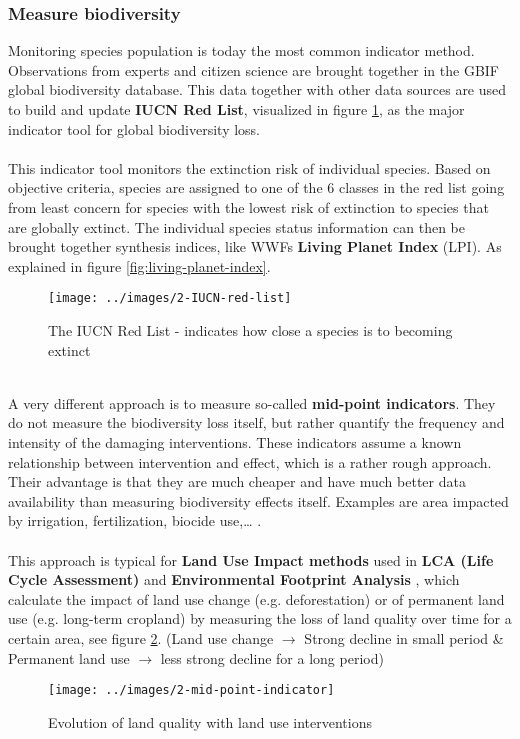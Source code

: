 \documentclass[../summary.tex]{subfiles}
\begin{document}
	\subsubsection{Measure biodiversity}
	Monitoring species population is today the most common indicator method. Observations from experts and citizen science are brought together in the GBIF global biodiversity database. This data together with other data sources are used to build and update \textbf{IUCN Red List}, visualized in figure \ref{fig:iucn-red-list}, as the major indicator tool for global biodiversity loss.
	\\\\
	This indicator tool monitors the extinction risk of individual species. Based on objective criteria, species are assigned to one of the 6 classes in the red list going from least concern for species with the lowest risk of extinction to species that are globally extinct. The individual species status information can then be brought together synthesis indices, like WWFs \textbf{Living Planet Index} (LPI). As explained in figure \ref{fig:living-planet-index}.
	
	\begin{figure}[H]
		\centering
		\texttt{[image: ../images/2-IUCN-red-list]}
		\caption{The IUCN Red List - indicates how close a species is to becoming extinct}
		\label{fig:iucn-red-list}
	\end{figure}
	
	\newpage
	\ \\
	A very different approach is to measure so-called \textbf{mid-point indicators}. They do not measure the biodiversity loss itself, but rather quantify the frequency and intensity of the damaging interventions. These indicators assume a known relationship between intervention and effect, which is a rather rough approach. Their advantage is that they are much cheaper and have much better data availability than measuring biodiversity effects itself. Examples are area impacted by irrigation, fertilization, biocide use,… .
	\\\\
	This approach is typical for \textbf{Land Use Impact methods} used in \textbf{LCA (Life Cycle Assessment)} and \textbf{Environmental Footprint Analysis} , which calculate the impact of land use change (e.g. deforestation) or of permanent land use (e.g. long-term cropland) by measuring the loss of land quality over time for a certain area, see figure \ref{fig:mid-point-indicator}.
	(Land use change $\rightarrow$ Strong decline in small period \& Permanent land use $\rightarrow$ less strong decline for a long
	period)	
	\begin{figure}[H]
		\centering
		\texttt{[image: ../images/2-mid-point-indicator]}
		\caption{Evolution of land quality with land use interventions}
		\label{fig:mid-point-indicator}
	\end{figure}
	
\end{document}
